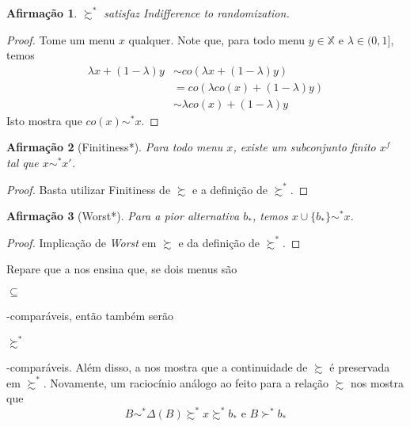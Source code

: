 \documentclass[11pt, a4paper]{article}
\theoremstyle{nonumberplain}
\newtheorem{proof}{Dem.}
\theoremstyle{plain}
\theoremstyle{plain}
\newtheorem{claim}{Afirmação}
\theoremstyle{plain}
\begin{document}
\begin{claim}$\succsim^*$ satisfaz \emph{Indifference to randomization}.\end{claim}
\begin{proof}
Tome um menu $x$ qualquer. Note que, para todo menu $y\in \mathbb{X}$ e $\lambda \in (0,1]$, temos 
\begin{align*}
\lambda x+(1-\lambda)y &\sim co(\lambda x+(1-\lambda)y)\\ &= co(\lambda co(x)+(1-\lambda)y)\\
&\sim \lambda co(x)+(1-\lambda)y
\end{align*}
Isto mostra que $co(x)\sim^*x$.    
\end{proof}


\begin{claim}[Finitiness*]Para todo menu $x$, existe um subconjunto finito $x^f$ tal que $x\sim^* x'$.\end{claim}
\begin{proof}
Basta utilizar Finitiness de $\succsim$ e a definição de $\succsim^*$. 
\end{proof}

\begin{claim}[Worst*] Para a pior alternativa $b_*$, temos $x\cup\{b_*\}\sim^* x$.\end{claim}
\begin{proof}
Implicação de \textit{Worst} em $\succsim$ e da definição de $\succsim^*$. 
\end{proof}



Repare que a  nos ensina que, se dois menus são \begin{small}$\subseteq$\end{small}-comparáveis, então também serão \begin{small}$\succsim^*$\end{small}-comparáveis. Além disso, a  nos mostra que a continuidade de $\succsim$ é preservada em $\succsim^*$. Novamente, um raciocínio análogo ao feito para a relação $\succsim$ nos mostra que \[B\sim^*\Delta(B)\succsim^* x\succsim^* b_* \text{ e } B\succ^* b_*\]
\end{document}
